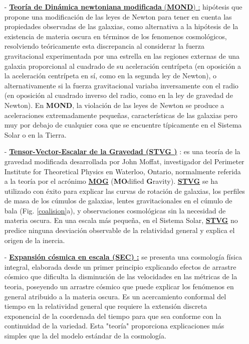 \begin{itemize}
\item[-] \href{https://en.wikipedia.org/wiki/Modified_Newtonian_dynamics}{\textbf{Teoría de Dinámica newtoniana modificada} (\textbf{MOND}) :}
hipótesis que propone una modificación de las leyes de Newton para tener en cuenta las propiedades observadas de las galaxias, como alternativa a la hipótesis de la existencia de materia oscura en términos de los fenomenos cosmológicos, resolviendo teóricamente esta discrepancia al considerar la fuerza gravitacional experimentada por una estrella en las regiones externas de una galaxia proporcional al cuadrado de su aceleración centrípeta (en oposición a la aceleración centrípeta en sí, como en la segunda ley de Newton), o alternativamente si la fuerza gravitacional variaba inversamente con el radio (en oposición al cuadrado inverso del radio, como en la ley de gravedad de Newton). En \textbf{MOND}, la violación de las leyes de Newton se produce a aceleraciones extremadamente pequeñas, características de las galaxias pero muy por debajo de cualquier cosa que se encuentre típicamente en el Sistema Solar o en la Tierra.

\item[-] \href{https://en.wikipedia.org/wiki/Scalar\%E2\%80\%93tensor\%E2\%80\%93vector_gravity}{\textbf{Tensor-Vector-Escalar de la Gravedad (STVG %
)}} : es una teoría de la gravedad modificada desarrollada por John Moffat, investigador del Perimeter Institute for Theoretical Physics en Waterloo, Ontario, normalmente referida a la teoría por el acrónimo \href{https://en.wikipedia.org/wiki/Scalar\%E2\%80\%93tensor\%E2\%80\%93vector_gravity}{\textbf{MOG}} (\textbf{MO}dified \textbf{G}ravity). \href{https://en.wikipedia.org/wiki/Scalar\%E2\%80\%93tensor\%E2\%80\%93vector_gravity}{\textbf{STVG}} se ha utilizado con éxito para explicar las curvas de rotación de galaxias, los perfiles de masa de los cúmulos de galaxias, lentes gravitacionales en el cúmulo de bala (Fig. \ref{coalision}a), y observaciones cosmológicas sin la necesidad de materia oscura. En una escala más pequeña, en el Sistema Solar, \href{https://en.wikipedia.org/wiki/Scalar\%E2\%80\%93tensor\%E2\%80\%93vector_gravity}{\textbf{STVG}} no predice ninguna desviación observable de la relatividad general y explica el origen de la inercia.

\item[-] \href{https://ca.wikipedia.org/wiki/Expansi\%C3\%B3_c\%C3\%B2smica_en_escala}{\textbf{Expansión cósmica en escala (SEC) :}} 
se presenta una cosmología física integral, elaborada desde un primer principio explicando efectos de arrastre cósmico que dificulta la disminución de las velocidades en las métricas de la teoria, poseyendo un arrastre cósmico que puede explicar los fenómenos en general atribuido a la materia oscura. Es un acercamiento conformal del tiempo en la relatividad general que requiere la extensión discreta exponencial de la coordenada del tiempo para que sea conforme con la continuidad de la variedad. Esta "teoría" proporciona explicaciones más simples que la del modelo estándar de la cosmología.


\end{itemize}

